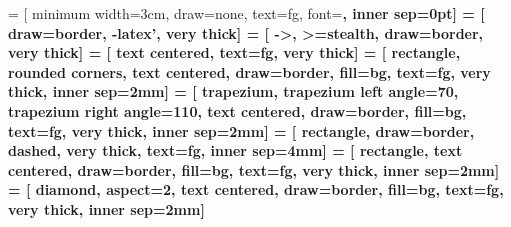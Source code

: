  = [
    minimum width=3cm,
    draw=none,
    text=fg,
    font=\bf,
    inner sep=0pt]
 = [
    draw=border,
    -latex',
    very thick]
 = [
    ->,
    >=stealth,
    draw=border,
    very thick]
 = [
    text centered,
    text=fg,
    very thick]
 = [
    rectangle,
    rounded corners,
    text centered,
    draw=border,
    fill=bg,
    text=fg,
    very thick,
    inner sep=2mm]
 = [
    trapezium,
    trapezium left angle=70,
    trapezium right angle=110,
    text centered,
    draw=border,
    fill=bg,
    text=fg,
    very thick,
    inner sep=2mm]
 = [
    rectangle,
    draw=border,
    dashed,
    very thick,
    text=fg,
    inner sep=4mm]
 = [
    rectangle,
    text centered,
    draw=border,
    fill=bg,
    text=fg,
    very thick,
    inner sep=2mm]
 = [
    diamond,
    aspect=2,
    text centered,
    draw=border,
    fill=bg,
    text=fg,
    very thick,
    inner sep=2mm]
